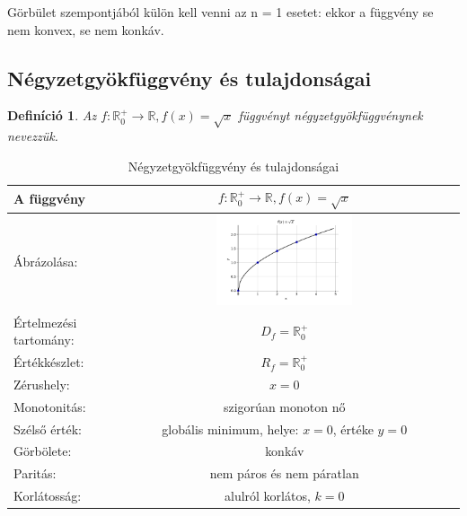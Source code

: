 \documentclass[12pt,a4paper]{article}
\newtheorem{definition}{Definíció} [section]
\begin{document}
Görbület szempontjából külön kell venni az n = 1 esetet: ekkor a függvény se nem konvex, se nem konkáv.

\newpage
\subsection{Négyzetgyökfüggvény és tulajdonságai}
\begin{definition}
Az $f:\mathbb{R}_0^+\rightarrow\mathbb{R}, f(x)=\sqrt{x}$ függvényt négyzetgyökfüggvénynek nevezzük.
\end{definition}


\begin{table}[h!]
\centering
\begin{tabular}{ | m{5cm} || c | }
A függvény & $f:\mathbb{R}_0^+\rightarrow\mathbb{R}, f(x)=\sqrt{x}$  \\
\hline
Ábrázolása: & \includegraphics[width=0.4\textwidth]{chart/2021-10-31--11:04:09}\\
\hline
Értelmezési tartomány: & $D_f=\mathbb{R}_0^+$ \\
\hline
Értékkészlet: & $R_f=\mathbb{R}_0^+$ \\
\hline
Zérushely: & $x=0$\\
\hline
Monotonitás: & szigorúan monoton nő\\
\hline
Szélső érték: & globális minimum, helye: $x=0$, értéke $y=0$\\
\hline
Görbölete: & konkáv \\
\hline
Paritás: & nem páros és nem páratlan \\
\hline
Korlátosság: & alulról korlátos, $k=0$
\end{tabular}
\caption{Négyzetgyökfüggvény és tulajdonságai}
\label{table:gyok_fugg}
\end{table}
\end{document}
